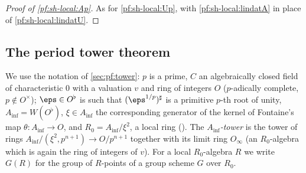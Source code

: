 \begin{proof}[Proof of \cref{pf:sh-local:Ap}]
As for \cref{pf:sh-local:Up}, with \cref{pf:sh-local:lindatA} in place of \cref{pf:sh-local:lindatU}.
\end{proof}

\subsection{The period tower theorem}\label{sec:pf:sh-local:ptd}

We use the notation of \cref{sec:pf:tower}: $p$ is a prime, $C$ an algebraically closed field of characteristic $0$
with a valuation $v$ and ring of integers $O$ ($p$-adically complete, $p\notin O^\times$); $\eps\in O^\flat$ is such
that $(\eps^{1/p})^\sharp$ is a primitive $p$-th root of unity, $A_{\inf}=W(O^\flat)$, $\xi\in A_{\inf}$ the
corresponding generator of the kernel of Fontaine's map $\theta:A_{\inf}\to O$, and $R_0=A_{\inf}/\xi^2$, a local ring
(). The \emph{$A_{\inf}$-tower} is the tower of rings
$A_{\inf}/(\xi^2,p^{n+1})\to O/p^{n+1}$ together with its limit ring $O_\infty$ (an $R_0$-algebra which is again the
ring of integers of $v$). For a local $R_0$-algebra $R$ we write
$G(R)$ for the group of $R$-points of a group scheme $G$ over $R_0$.

